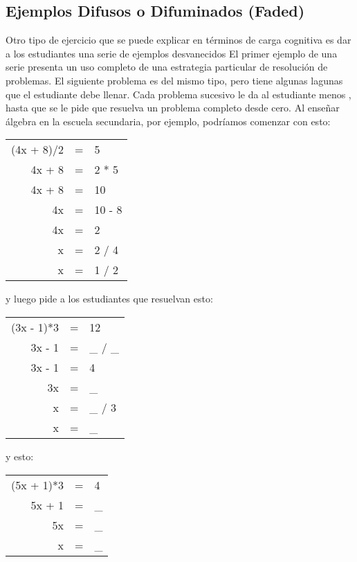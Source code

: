 \subsection*{Ejemplos Difusos o Difuminados (Faded)}

Otro tipo de ejercicio que se puede explicar en términos de carga cognitiva es dar a los estudiantes una serie de ejemplos desvanecidos 
El primer ejemplo de una serie presenta un uso completo de una estrategia particular de resolución de problemas. El siguiente problema es del mismo tipo, pero tiene algunas lagunas que el estudiante debe llenar. Cada problema sucesivo le da al estudiante menos ,
hasta que se le pide que resuelva un problema completo desde cero. Al enseñar álgebra en la escuela secundaria, por ejemplo, podríamos comenzar con esto:


\begin{center}
\begin{tabular}{rcl}
  (4x + 8)/2	& = &	5	\\
  4x + 8	& = &	2 * 5	\\
  4x + 8	& = &	10	\\
  4x		& = &	10 - 8	\\
  4x		& = &	2	\\
  x		& = &	2 / 4	\\
  x		& = &	1 / 2
\end{tabular}
\end{center}

\noindent
y luego pide a los estudiantes que resuelvan esto:

\begin{center}
\begin{tabular}{rcl}
  (3x - 1)*3	& = &	12	\\
  3x - 1	& = &	\_ / \_	\\
  3x - 1	& = &	4	\\
  3x		& = &	\_	\\
  x		& = &	\_ / 3	\\
  x		& = &	\_
\end{tabular}
\end{center}

\noindent
y esto:

\begin{center}
\begin{tabular}{rcl}
  (5x + 1)*3	& = &	4	\\
  5x + 1	& = &	\_ 	\\
  5x		& = &	\_ 	\\
  x		& = &	\_
\end{tabular}
\end{center}

